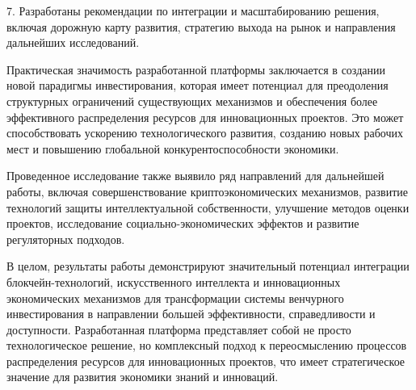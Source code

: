 \documentclass[
    candidate, %
    subf, %
    dotsinheaders=false,
]{disser}
\begin{document}
7. Разработаны рекомендации по интеграции и масштабированию решения, включая дорожную карту развития, стратегию выхода на рынок и направления дальнейших исследований.

Практическая значимость разработанной платформы заключается в создании новой парадигмы инвестирования, которая имеет потенциал для преодоления структурных ограничений существующих механизмов и обеспечения более эффективного распределения ресурсов для инновационных проектов. Это может способствовать ускорению технологического развития, созданию новых рабочих мест и повышению глобальной конкурентоспособности экономики.

Проведенное исследование также выявило ряд направлений для дальнейшей работы, включая совершенствование криптоэкономических механизмов, развитие технологий защиты интеллектуальной собственности, улучшение методов оценки проектов, исследование социально-экономических эффектов и развитие регуляторных подходов.

В целом, результаты работы демонстрируют значительный потенциал интеграции блокчейн-технологий, искусственного интеллекта и инновационных экономических механизмов для трансформации системы венчурного инвестирования в направлении большей эффективности, справедливости и доступности. Разработанная платформа представляет собой не просто технологическое решение, но комплексный подход к переосмыслению процессов распределения ресурсов для инновационных проектов, что имеет стратегическое значение для развития экономики знаний и инноваций.





\end{document}
